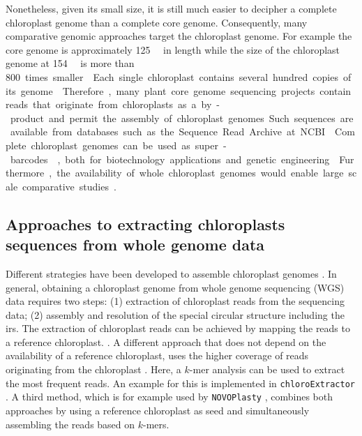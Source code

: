 \documentclass{bmcart}
\newcommand{\todo}[1]{\textcolor{red}{\bfseries(ToDO: #1})}
\newcommand{\formatprogramnames}[1]{\texttt{#1}}
\newcommand{\ce}{\formatprogramnames{chloroExtractor}}
\newcommand{\np}{\formatprogramnames{NOVOPlasty}}
\begin{document}
Nonetheless, given its small size, it is still much easier to decipher a complete chloroplast genome than a complete core genome. Consequently, many comparative genomic approaches target the chloroplast genome.
For example the  core genome is approximately \SI{125}{\mega\basepair} in length \cite{schmuths2004,cao2011} while the size of the  chloroplast genome at \SI{154}{\kilo\basepair} is more than \SI{800} times smaller \cite{sato1999}.

Each single chloroplast contains several hundred copies of its genome \cite{kumar_2014,bendich_1987}.
Therefore, many plant core genome sequencing projects contain reads that originate from chloroplasts as a by-product and permit the assembly of chloroplast genomes.
Such sequences are available from databases such as the Sequence Read Archive at NCBI \cite{sra2010}.

Complete chloroplast genomes can be used as super-barcodes \cite{coissac_barcodes_2016}, both for biotechnology applications and genetic engineering \cite{daniell_chloroplast_2016}.
Furthermore, the availability of whole chloroplast genomes would enable large scale comparative studies \cite{tonti-filippini_what_2017}.


\subsection*{Approaches to extracting chloroplasts sequences from whole genome data}

Different strategies have been developed to assemble chloroplast genomes \cite{twyford_strategies_2017}.
In general, obtaining a chloroplast genome from whole genome sequencing (WGS) data requires two steps: (1) extraction of chloroplast reads from the sequencing data;  
(2) assembly and resolution of the special circular structure including the \glspl{ir}.
The extraction of chloroplast reads can be achieved by mapping the reads to a reference chloroplast. \cite{Vinga2012}.
A different approach that does not depend on the availability of a reference chloroplast, uses the higher coverage of reads originating from the chloroplast \cite{Chan2013}.
Here, a $k$-mer analysis can be used to extract the most frequent reads.
An example for this is implemented in \ce{} \cite{j_ankenbrand_chloroextractor:_2018}. %
A third method, which is for example used by \np{} \cite{dierckxsens_novoplasty:_2017}, combines both approaches by using a reference chloroplast as seed and simultaneously assembling the reads based on $k$-mers. 
\end{document}

